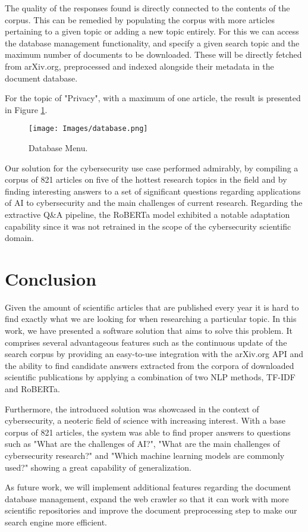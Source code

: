 \documentclass[runningheads]{llncs}
\begin{document}
The quality of the responses found is directly connected to the contents of the corpus. This can be remedied by populating the corpus with more articles pertaining to a given topic or adding a new topic entirely.
For this we can access the database management functionality, and specify a given search topic and the maximum number of documents to be downloaded. These will be directly fetched from arXiv.org, preprocessed and indexed alongside their metadata in the document database.

For the topic of "Privacy", with a maximum of one article, the result is presented in Figure \ref{fig:db}.

\begin{figure}[H]
\centering
\texttt{[image: Images/database.png]}
\caption{Database Menu.}
\label{fig:db}
\end{figure}

Our solution for the cybersecurity use case performed admirably, by compiling a corpus of 821 articles on five of the hottest research topics in the field and by finding interesting answers to a set of significant questions regarding applications of AI to cybersecurity and the main challenges of current research. Regarding the extractive Q\&A pipeline, the RoBERTa model exhibited a notable adaptation capability since it was not retrained in the scope of the cybersecurity scientific domain.

\section{Conclusion}
\label{section:conclusion}

Given the amount of scientific articles that are published every year it is hard to find exactly what we are looking for when researching a particular topic. In this work, we have presented a software solution that aims to solve this problem. It comprises several advantageous features such as the continuous update of the search corpus by providing an easy-to-use integration with the arXiv.org API and the ability to find candidate answers extracted from the corpora of downloaded scientific publications by applying a combination of two NLP methods, TF-IDF and RoBERTa.

Furthermore, the introduced solution was showcased in the context of cybersecurity, a neoteric field of science with increasing interest. With a base corpus of 821 articles, the system was able to find proper answers to questions such as "What are the challenges of AI?", "What are the main challenges of cybersecurity research?" and "Which machine learning models are commonly used?" showing a great capability of generalization.

As future work, we will implement additional features regarding the document database management, expand the web crawler so that it can work with more scientific repositories and improve the document preprocessing step to make our search engine more efficient.



\end{document}
